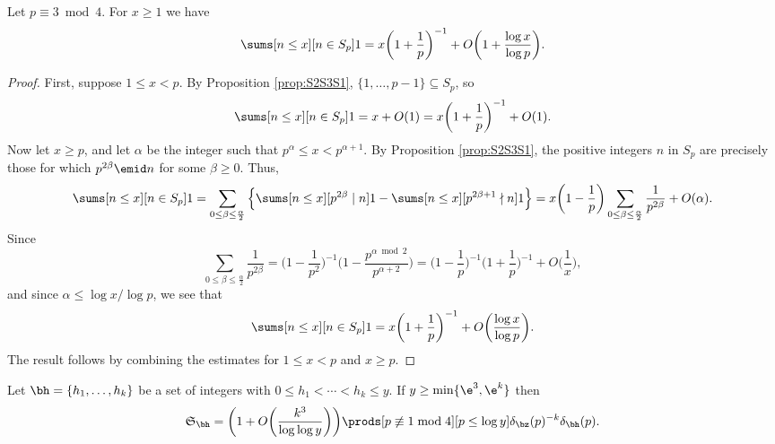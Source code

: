 \documentclass[12pt, reqno, twoside, letterpaper]{amsart}
\begin{document}
\begin{jetsam}
\begin{proposition}
 \label{prop:Sp3est}
Let $p \equiv 3 \bmod 4$.
%
For $x \ge 1$ we have 
\[
   \sums[n \le x][n \in S_p] 1
    =
     x\bigg(1 + \frac{1}{p}\bigg)^{-1}
      + O\bigg(1 + \frac{\log x}{\log p}\bigg).
\]
\end{proposition}

\begin{proof}
%
First, suppose $1 \le x < p$.
%
By Proposition \ref{prop:S2S3S1}, 
$\{1,\ldots,p - 1\} \subseteq S_p$, so 
\[
  \sums[n \le x][n \in S_p] 1
  = 
   x + O(1)
    =
     x\bigg(1 + \frac{1}{p}\bigg)^{-1} + O(1).
\]
%
Now let $x \ge p$, and let $\alpha$ be the integer such that 
$p^{\alpha} \le x < p^{\alpha + 1}$.
%
By Proposition \ref{prop:S2S3S1}, the positive integers $n$ in 
$S_p$ are precisely those for which $p^{2\beta} \emid n$ for some 
$\beta \ge 0$.
%
Thus, 
\begin{align*}
 \sums[n \le x][n \in S_p] 1
  =
   \sum_{0 \le \beta \le \frac{\alpha}{2}}
    \Big\{
     \sums[n \le x][p^{2\beta} \mid n] 1
      -
       \sums[n \le x][p^{2\beta + 1} \nmid n] 1
    \Big\}
     =
      x\bigg(1 - \frac{1}{p}\bigg)
        \sum_{0 \le \beta \le \frac{\alpha}{2}}
         \frac{1}{p^{2\beta}}
         +
          O(\alpha).
\end{align*}
%
Since 
\[
 \sum_{0 \le \beta \le \frac{\alpha}{2}} \frac{1}{p^{2\beta}}
  =
   \bigg(1 - \frac{1}{p^2}\bigg)^{-1}
    \bigg(1 - \frac{p^{\alpha \bmod 2}}{p^{\alpha + 2}}\bigg)
   =
    \bigg(1 - \frac{1}{p}\bigg)^{-1}
     \bigg(1 + \frac{1}{p}\bigg)^{-1} 
   + O\bigg(\frac{1}{x}\bigg), 
\]
and since $\alpha \le \log x/\log p$, we see that  
\[
 \sums[n \le x][n \in S_p] 1
  = 
   x\bigg(1 + \frac{1}{p}\bigg)^{-1} 
   + O\bigg(\frac{\log x}{\log p}\bigg).
\]
%
The result follows by combining the estimates for $1 \le x < p$ 
and $x \ge p$.
\end{proof}


\begin{lemma}
 \label{lem:sssak=2aux1}
Let $\bh = \{h_1,\ldots,h_k\}$ be a set of integers with 
$0 \le h_1 < \cdots < h_k \le y$.
%
If $y \ge \min\{\e^3,\e^k\}$ then 
\begin{equation}
 \label{eq:sotssingserconv3}
  \mathfrak{S}_{\bh}
   =
    \bigg(1 + O\bigg(\frac{k^3}{\log\log y}\bigg)\bigg)
     \prods[p \not\equiv 1 \bmod 4][p \le \log y] 
      \delta_{\bz}(p)^{-k}\delta_{\bh}(p).
\end{equation}
\end{lemma}


\end{jetsam}
\end{document}
